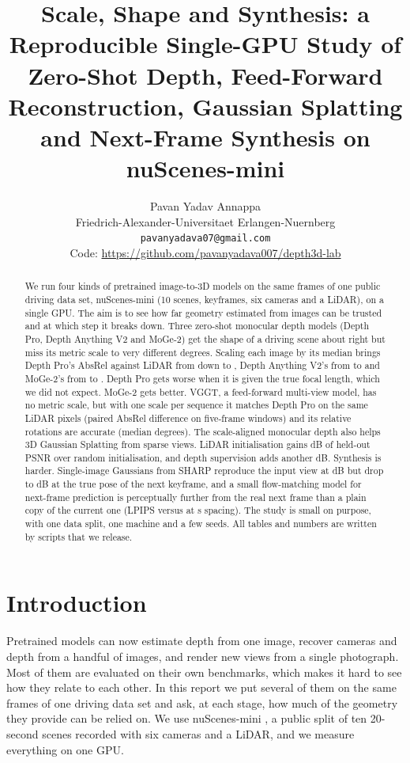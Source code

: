 \documentclass[10pt]{article}
\title{Scale, Shape and Synthesis: a Reproducible Single-GPU Study of Zero-Shot Depth,
Feed-Forward Reconstruction, Gaussian Splatting and Next-Frame Synthesis on nuScenes-mini}
\author{Pavan Yadav Annappa\\
Friedrich-Alexander-Universitaet Erlangen-Nuernberg\\
\texttt{pavanyadava07@gmail.com}\\[2pt]
\small Code: \url{https://github.com/pavanyadava007/depth3d-lab}}
\date{}
\newcommand{\gpu}{\GPUname}
\begin{document}
\maketitle

\begin{abstract}
We run four kinds of pretrained image-to-3D models on the same frames of one public driving data set,
nuScenes-mini (10 scenes, \GTkeyframes{} keyframes, six cameras and a LiDAR), on a single \gpu{} GPU. The aim
is to see how far geometry estimated from images can be trusted and at which step it breaks down. Three
zero-shot monocular depth models (Depth Pro, Depth Anything V2 and MoGe-2) get the shape of a driving scene
about right but miss its metric scale to very different degrees. Scaling each image by its median brings
Depth Pro's AbsRel against LiDAR from \DPabsrelRaw{} down to \DPabsrelScaled{}, Depth Anything V2's from
\DAVabsrelRaw{} to \DAVabsrelScaled{} and MoGe-2's from \MOGEabsrelRaw{} to \MOGEabsrelScaled{}. Depth Pro
gets worse when it is given the true focal length, which we did not expect. MoGe-2 gets better. VGGT, a
feed-forward multi-view model, has no metric scale, but with one scale per sequence it matches Depth Pro on
the same LiDAR pixels (paired AbsRel difference \BTemppairedSeq{} on five-frame windows) and its relative
rotations are accurate (median \BTemprotMedian{} degrees). The scale-aligned monocular depth also helps
3D Gaussian Splatting from sparse views. LiDAR initialisation gains \GSdeltaLidarRandom{} dB of held-out
PSNR over random initialisation, and depth supervision adds another \GSdeltaDepthHiPsnr{} dB. Synthesis is
harder. Single-image Gaussians from SHARP reproduce the input view at \SharpIdpsnr{} dB but drop to
\SharpKeypsnr{} dB at the true pose of the next keyframe, and a small flow-matching model for next-frame
prediction is perceptually further from the real next frame than a plain copy of the current one (LPIPS
\NFFmlpips{} versus \NFCopylpips{} at \NFdtMedian{} s spacing). The study is small on purpose, with one data
split, one machine and a few seeds. All tables and numbers are written by scripts that we release.
\end{abstract}

\section{Introduction}
\label{sec:intro}

Pretrained models can now estimate depth from one image, recover cameras and depth from a handful of
images, and render new views from a single photograph. Most of them are evaluated on their own benchmarks,
which makes it hard to see how they relate to each other. In this report we put several of them on the same
frames of one driving data set and ask, at each stage, how much of the geometry they provide can be relied
on. We use nuScenes-mini \citep{caesar2020nuscenes}, a public split of ten 20-second scenes recorded with
six cameras and a LiDAR, and we measure everything on one \gpu{} GPU.
\end{document}
